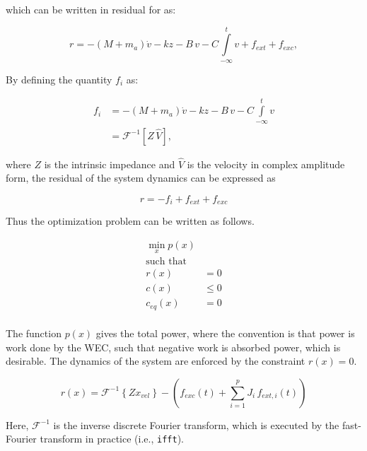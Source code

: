 \documentclass[]{article}
\begin{document}
\noindent{}which can be written in residual for as:

\begin{equation}
	r = -(M + m_a) \dot{v} - k z - B \, v - C \int\limits_{-\infty}^t v  + f_{ext} + f_{exc},
\end{equation}

By defining the quantity $f_i$ as:

\begin{subequations}
	\begin{align}
		f_i &= -(M + m_a) \dot{v} - k z - B \, v - C \int\limits_{-\infty}^t v \\
			&= \mathcal{F}^{-1} \left[ Z \, \hat{V}  \right] ,
	\end{align}
\end{subequations}

\noindent{}where $Z$ is the intrinsic impedance and $\hat{V}$ is the velocity in complex amplitude form, the residual of the system dynamics can be expressed as

\begin{equation}
	r = - f_i + f_{ext} + f_{exc}
\end{equation}

Thus the optimization problem can be written as follows.

\begin{equation}\label{eq:optimization_problem}
	\begin{aligned}
	\min_x p(x)&\\
	\textrm{such that }&\\
	r(x)&=0\\
	c(x)& \leq 0\\
	c_{eq}(x)&=0\\
	\end{aligned}
\end{equation}

\noindent{}The function $p(x)$ gives the total power, where the convention is that power is work done by the WEC, such that negative work is absorbed power, which is desirable.
The dynamics of the system are enforced by the constraint $r(x)=0$.

\begin{equation}\label{eq:residual_form}
	r(x) = \mathcal{F}^{-1}\left\{ Z x_{vel} \right\} - \left( f_{exc}(t) + \sum\limits_{i=1}^p J_i \, f_{ext,i}(t) \right)
\end{equation}

\noindent{}Here, $\mathcal{F}^{-1}$ is the inverse discrete Fourier transform, which is executed by the fast-Fourier transform in practice (i.e., \texttt{ifft}).
\end{document}
